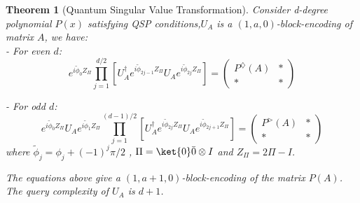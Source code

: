 \documentclass{article}
\newtheorem{theorem}{Theorem}[section]
\begin{document}
    \begin{theorem}[Quantum Singular Value Transformation]
        Consider d-degree polynomial $ P(x) $ satisfying QSP conditions,$U_A$ is a $(1,a,0)$-block-encoding of matrix $A$, we have:\\
        - For even $ d $:
        $$
        e^{i\tilde{\phi}_0 Z_\Pi} \prod_{j=1}^{d/2} \left[ U_A^\dagger e^{i\tilde{\phi}_{2j-1} Z_\Pi} U_A e^{i\tilde{\phi}_{2j} Z_\Pi} \right] =
        \begin{pmatrix}
            P^\diamondsuit(A) & * \\
            *                 & *
        \end{pmatrix}
        $$

        - For odd $ d $:
        $$
        e^{i\tilde{\phi}_0 Z_\Pi} U_A e^{i\tilde{\phi}_1 Z_\Pi} \prod_{j=1}^{(d-1)/2} \left[ U_A^\dagger e^{i\tilde{\phi}_{2j} Z_\Pi} U_A e^{i\tilde{\phi}_{2j+1} Z_\Pi} \right] =
        \begin{pmatrix}
            P^\vartriangleright(A) & * \\
            *                      & *
        \end{pmatrix}
        $$
        where $ \tilde{\phi}_j = \phi_j + (-1)^j \pi/2 $ , $\Pi = \ket{0}\bar{0}\otimes I$ and $ Z_\Pi = 2\Pi - I $.

        The equations above give a $(1,a+1,0)$-block-encoding of the matrix $P(A)$.
        The query complexity of $U_A$ is $d+1$.

        \label{thm:qsvt}
    \end{theorem}







    
    
\end{document}
